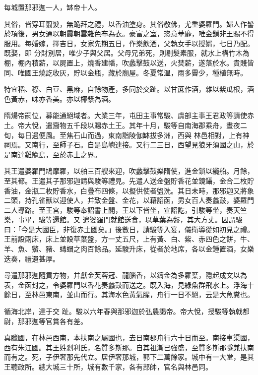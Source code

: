 \begin{pinyinscope}
 每城置那邪迦一人，缽帝十人。



 其俗，皆穿耳翦髮，無跪拜之禮，以香油塗身。其俗敬佛，尤重婆羅門。婦人作髻於項後，男女通以朝霞朝雲雜色布為衣。豪富之室，恣意華靡，唯金鎖非王賜不得服用。每婚嫁，擇吉日，女家先期五日，作樂飲酒，父執女手以授婿，七日乃配。既娶，即
 分財別居，唯少子與父居。父母兄弟死，則剔髮素服，就水上構竹木為棚，棚內積薪，以屍置上，燒香建幡，吹蠡擊鼓以送，火焚薪，遂落於水。貴賤皆同、唯國王燒訖收灰，貯以金瓶，藏於廟屋。冬夏常溫，雨多霽少，種植無時。



 特宜稻、穄、白豆、黑麻，自餘物產，多同於交趾。以甘蔗作酒，雜以紫瓜根，酒色黃赤，味亦香美。亦以椰漿為酒。



 隋煬帝嗣位，募能通絕域者。大業三年，屯田主事常駿、虞部主事王君政等請使赤土。帝大悅，遣齎物五千段以賜赤土王。其年十月，駿等自南海郡乘舟，晝夜二旬，每日遇便風。至焦石山而過，東南詣陵伽缽拔多洲，西與
 林邑相對，上有神祠焉。又南行，至師子石。自是島嶼連接。又行二三日，西望見狼牙須國之山，於是南達雞籠島，至於赤土之界。



 其王遣婆羅門鳩摩羅，以舶三百艘來迎，吹蠡擊鼓樂隋使，進金鎖以纜船。月餘，至其都。王遣其子那邪迦請與駿等禮見。先遣人送金盤貯香花並鏡鑷，金合二枚貯香油，金瓶二枚貯香水，白疊布四條，以擬供使者盥洗。其日未時，那邪迦又將象二頭，持孔雀獸以迎使人，并致金盤、金花，以藉詔函，男女百人奏蠡鼓，婆羅門二人導路。至王宮，駿等奉詔書上閣，王以下皆坐，宣詔訖，引駿等坐，奏天竺樂，事畢，駿等還館。又
 遣婆羅門就館送食，以草葉為盤，其大方丈。因謂駿曰：「今是大國臣，非復赤土國矣。」後數日，請駿等入宴，儀衛導從如初見之禮。王前設兩床，床上並設草葉盤，方一丈五尺，上有黃、白、紫、赤四色之餅，牛、羊、魚、鱉、豬、蝳蝐之肉百餘品。延駿升床，從者於地席，各以金鍾置酒，女樂迭奏，禮遺甚厚。



 尋遣那邪迦隨貢方物，并獻金芙蓉冠、龍腦香，以鑄金為多羅葉，隱起成文以為表，金函封之，令婆羅門以香花奏蠡鼓而送之。既入海，見綠魚群飛水上。浮海十餘日，至林邑東南，並山而行。其海水色黃氣腥，舟行一日不絕，云是大魚糞也。



 循海北岸，達于交
 趾。駿以六年春與那邪迦於弘農謁帝。帝大悅，授駿等執戟都尉，那邪迦等官賞各有差。



 真臘國，在林邑西南，本扶南之屬國也，去日南郡舟行六十日而至。南接車渠國，西有朱江國。其王姓剎利氏，名質多斯那。自其祖漸已強盛，至質多斯那隧兼扶南而有之。死，子伊奢那先代立。居伊奢那城，郭下二萬餘家。城中有一大堂，是其王聽政所。總大城三十所，城有數千家，各有部帥，官名與林邑同。




\end{pinyinscope}
